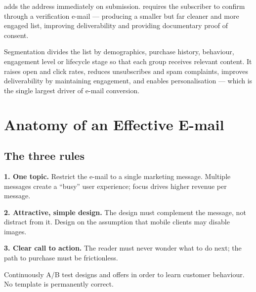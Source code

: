 \begin{definitionbox}
 adds the address immediately on
submission.  requires the subscriber to
confirm through a verification e-mail --- producing a smaller but far cleaner and
more engaged list, improving deliverability and providing documentary proof of
consent.
\end{definitionbox}

\begin{exambox}
Segmentation divides the list by demographics, purchase history, behaviour,
engagement level or lifecycle stage so that each group receives relevant content.
It raises open and click rates, reduces unsubscribes and spam complaints,
improves deliverability by maintaining engagement, and enables personalisation
--- which is the single largest driver of e-mail conversion.
\end{exambox}

\section{Anatomy of an Effective E-mail}

\subsection{The three rules}

\begin{frameworkbox}
\textbf{1. One topic.} Restrict the e-mail to a single marketing message.
Multiple messages create a ``busy'' user experience; focus drives higher revenue
per message.

\textbf{2. Attractive, simple design.} The design must complement the message,
not distract from it. Design on the assumption that mobile clients may disable
images.

\textbf{3. Clear call to action.} The reader must never wonder what to do next;
the path to purchase must be frictionless.
\end{frameworkbox}

\begin{keybox}
Continuously A/B test designs and offers in order to learn customer behaviour. No
template is permanently correct.
\end{keybox}

